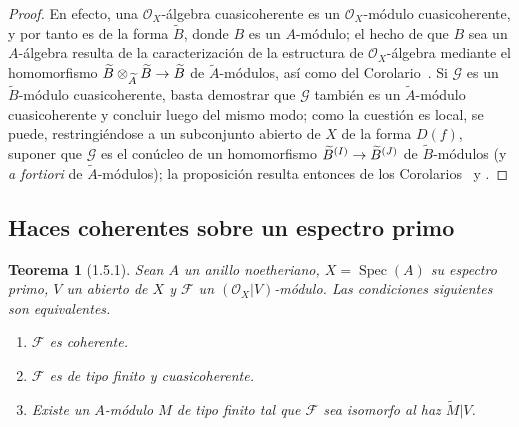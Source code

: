 \documentclass[oneside]{amsart}
\theoremstyle{ega-env-style}
\theoremstyle{ega-thm-env-style}
\newtheorem*{theorem}{Teorema}
\theoremstyle{ega-defn-env-style}
\renewcommand{\to}{\mathchoice{\longrightarrow}{\rightarrow}{\rightarrow}{\rightarrow}}
\let\EGAOriginalLabel\label
\renewcommand{\label}[1]{\phantomsection\EGAOriginalLabel{#1}}
\begin{document}
\begin{proof}
En efecto, una $\mathscr{O}_X$-álgebra cuasicoherente es un $\mathscr{O}_X$-módulo cuasicoherente, y por tanto es de la forma $\widetilde{B}$, donde $B$ es un $A$-módulo;
el hecho de que $B$ sea un $A$-álgebra resulta de la caracterización de la estructura de $\mathscr{O}_X$-álgebra mediante el homomorfismo $\widetilde{B}\otimes_{\widetilde{A}}\widetilde{B}\to\widetilde{B}$ de $\widetilde{A}$-módulos, así como del Corolario~.
Si $\mathscr{G}$ es un $\widetilde{B}$-módulo cuasicoherente, basta demostrar que $\mathscr{G}$ también es un $\widetilde{A}$-módulo cuasicoherente y concluir luego del mismo modo;
como la cuestión es local, se puede, restringiéndose a un subconjunto abierto de $X$ de la forma $D(f)$, suponer que $\mathscr{G}$ es el conúcleo de un homomorfismo $\widetilde{B}^{(I)}\to\widetilde{B}^{(J)}$ de $\widetilde{B}$-módulos (y \emph{a fortiori} de $\widetilde{A}$-módulos);
la proposición resulta entonces de los Corolarios~ y .
\end{proof}

\subsection{Haces coherentes sobre un espectro primo}
\label{subsection:I.1.5}

\begin{theorem}[1.5.1]
\label{I.1.5.1}
Sean $A$ un anillo \emph{noetheriano}, $X=\operatorname{Spec}(A)$ su espectro primo, $V$ un abierto de $X$ y $\mathscr{F}$ un $(\mathscr{O}_X|V)$-módulo.
Las condiciones siguientes son equivalentes.
\begin{enumerate}
  \item[\textup{a)}] $\mathscr{F}$ es coherente.
  \item[\textup{b)}] $\mathscr{F}$ es de tipo finito y cuasicoherente.
  \item[\textup{c)}] Existe un $A$-módulo $M$ de tipo finito tal que $\mathscr{F}$ sea isomorfo al haz $\widetilde{M}|V$.
\end{enumerate}
\end{theorem}
\end{document}

